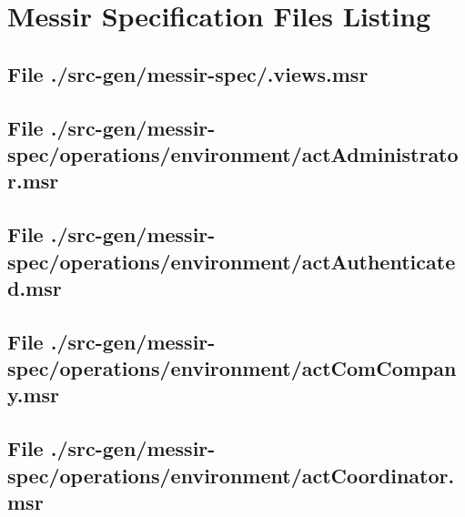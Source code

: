 \chapter{Messir Specification Files Listing}

\section[File /src-gen/messir-spec/.views.msr]{File ./src-gen/messir-spec/.views.msr}
\scriptsize

\normalsize
	
\section[File /src-gen/messir-spec/operations/environment/actAdministrator.msr]{File ./src-gen/messir-spec/operations/environment/actAdministrator.msr}
\scriptsize

\normalsize
	
\section[File /src-gen/messir-spec/operations/environment/actAuthenticated.msr]{File ./src-gen/messir-spec/operations/environment/actAuthenticated.msr}
\scriptsize

\normalsize
	
\section[File /src-gen/messir-spec/operations/environment/actComCompany.msr]{File ./src-gen/messir-spec/operations/environment/actComCompany.msr}
\scriptsize

\normalsize
	
\section[File /src-gen/messir-spec/operations/environment/actCoordinator.msr]{File ./src-gen/messir-spec/operations/environment/actCoordinator.msr}
\scriptsize

\normalsize
	
